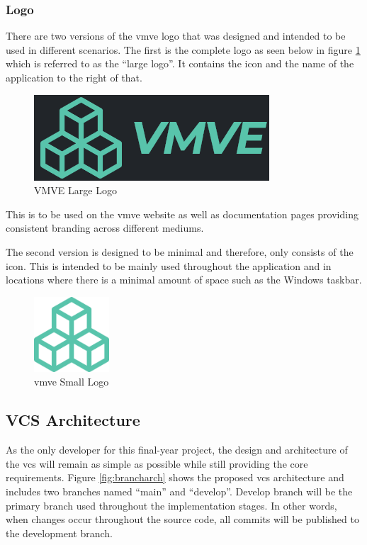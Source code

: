 \documentclass[11pt]{article}
\begin{document}
\subsubsection{Logo}
There are two versions of the \gls*{vmve} logo that was designed and intended to
be used in different scenarios. The first is the complete logo as seen below in
figure \ref{fig:project_logo_large} which is referred to as the ``large logo''.
It contains the icon and the name of the application to the right of that.
\begin{figure}[H]
  \centering
  \includegraphics[width=\textwidth]{images/project_logo.png}
  \caption{VMVE Large Logo}
  \label{fig:project_logo_large}
\end{figure}
This is to be used on the \gls*{vmve} website as well as documentation pages
providing consistent branding across different mediums.

The second version is designed to be minimal and therefore, only consists of the
icon. This is intended to be mainly used throughout the application and in
locations where there is a minimal amount of space such as the Windows taskbar.
\begin{figure}[H]
  \centering
  \includegraphics[width=0.25\textwidth]{images/project_icon.png}
  \caption{\gls*{vmve} Small Logo}
  \label{fig:project_logo_small}
\end{figure}


\subsection{VCS Architecture}
As the only developer for this final-year project, the design and architecture
of the \gls*{vcs} will remain as simple as possible while still providing the
core requirements. Figure \ref{fig:brancharch} shows the proposed \gls*{vcs}
architecture and includes two branches named ``main'' and ``develop''. Develop
branch will be the primary branch used throughout the implementation stages. In
other words, when changes occur throughout the source code, all commits will be
published to the development branch.
\end{document}
